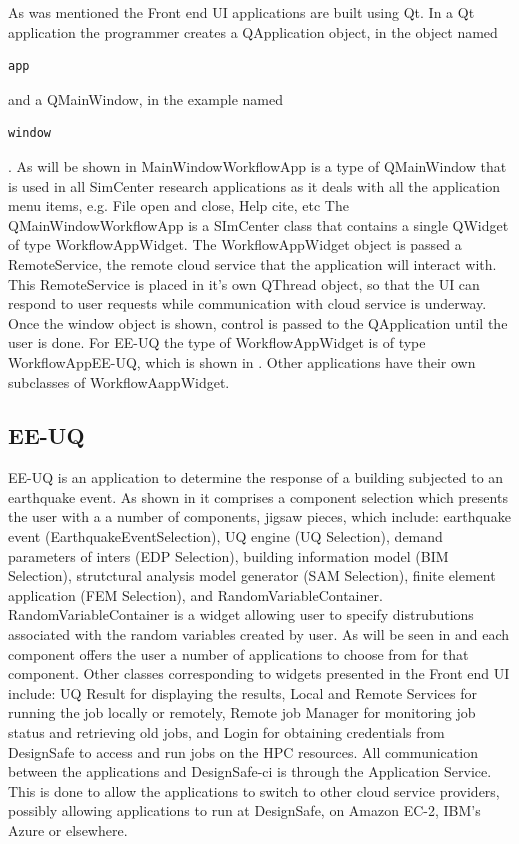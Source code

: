 As was mentioned the Front end UI applications are built using Qt. In a Qt application the programmer creates a QApplication object, in  the object named \begin{verbatim}app\end{verbatim} and a QMainWindow, in the example named \begin{verbatim}window\end{verbatim}. As will be shown in  MainWindowWorkflowApp is a type of QMainWindow that is used in all SimCenter research applications as it deals with all the application menu items, e.g. File open and close, Help cite, etc The QMainWindowWorkflowApp is a SImCenter class that contains a single QWidget of type WorkflowAppWidget. The WorkflowAppWidget object is passed a RemoteService, the remote cloud service that the application will interact with. This RemoteService is placed in it's own QThread object, so that the UI can respond to user requests while communication with cloud service is underway. Once the window object is shown, control is passed to the QApplication  until the user is done.
For EE-UQ the type of WorkflowAppWidget is of type WorkflowAppEE-UQ, which is shown in . Other applications have their own subclasses of WorkflowAappWidget.

\subsection{EE-UQ}

EE-UQ is an application to determine the response of a building subjected to an earthquake event. As shown in  it comprises a component selection which presents the user with a a number of components, jigsaw pieces, which include: earthquake event (EarthquakeEventSelection), UQ engine (UQ Selection), demand parameters of inters (EDP Selection), building information model (BIM Selection),  strutctural analysis model generator (SAM Selection), finite element application (FEM Selection), and RandomVariableContainer.  RandomVariableContainer is a widget allowing user to specify distrubutions associated with the random variables created by user. As will be seen in  and  each component offers the user a number of applications to choose from for that component. Other classes corresponding to widgets presented in the Front end UI include: UQ Result for displaying the results, Local and Remote Services for running the job locally or remotely, Remote job Manager for monitoring job status and retrieving old jobs, and Login for obtaining credentials from DesignSafe to access and run jobs on the HPC resources. All communication between the applications and DesignSafe-ci is through the Application Service. This is done to allow the applications to switch to other cloud service providers, possibly allowing applications to run at DesignSafe, on Amazon EC-2, IBM's Azure or elsewhere.

